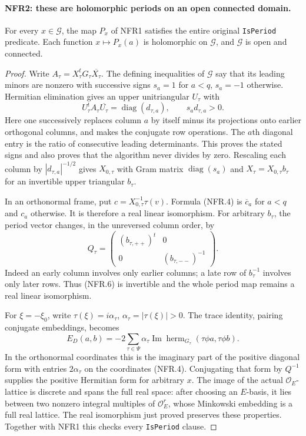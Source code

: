 \paragraph{NFR2: these are holomorphic periods on an open connected domain.}
\label{claim:NFR2}
For every $x\in\mathcal G$, the map $P_x$ of NFR1 satisfies the
entire original \texttt{IsPeriod} predicate.  Each function
$x\mapsto P_x(a)$ is holomorphic on $\mathcal G$, and
$\mathcal G$ is open and connected.

\begin{proof}
Write $A_\tau=X_\tau^tG_\tau\overline{X_\tau}$.
The defining inequalities of $\mathcal G$ say that its leading
minors are nonzero with successive signs
$s_a=1$ for $a<q$, $s_a=-1$ otherwise.
Hermitian elimination gives an upper unitriangular $U_\tau$ with
\[
 U_\tau^tA_\tau\overline{U_\tau}
       =\operatorname{diag}(d_{\tau,a}),\qquad s_a d_{\tau,a}>0.
 \tag{NFR.5}
\]
Here one successively replaces column $a$ by itself minus its
projections onto earlier orthogonal columns, and makes the
conjugate row operations.  The $a$th diagonal entry is the ratio
of consecutive leading determinants.  This proves the stated signs
and also proves that the algorithm never divides by zero.
Rescaling each column by $|d_{\tau,a}|^{-1/2}$ gives $X_{0,\tau}$
with Gram matrix $\operatorname{diag}(s_a)$ and
$X_\tau=X_{0,\tau}b_\tau$ for an invertible upper triangular $b_\tau$.

In an orthonormal frame, put $c=X_{0,\tau}^{-1}\tau(v)$.
Formula (NFR.4) is $\overline c_a$ for $a<q$ and $c_a$ otherwise.
It is therefore a real linear isomorphism.  For arbitrary $b_\tau$,
the period vector changes, in the unreversed column order, by
\[
 Q_\tau=
 \begin{pmatrix} (b_{\tau,++})^t&0\\0&(b_{\tau,--})^{-1}\end{pmatrix}.
 \tag{NFR.6}
\]
Indeed an early column involves only earlier columns; a late row
of $b_\tau^{-1}$ involves only later rows.  Thus (NFR.6) is
invertible and the whole period map remains a real linear isomorphism.

For $\xi=-\xi_0$, write $\tau(\xi)=i\alpha_\tau$,
$\alpha_\tau=|\tau(\xi)|>0$.
The trace identity, pairing conjugate embeddings, becomes
\[
 E_D(a,b)=-2\sum_{\tau\in\Psi}\alpha_\tau
          \operatorname{Im}\operatorname{herm}_{G_\tau}
                         (\tau\phi a,\tau\phi b).
 \tag{NFR.7}
\]
In the orthonormal coordinates this is the imaginary part of the
positive diagonal form with entries $2\alpha_\tau$ on the
coordinates (NFR.4).  Conjugating that form by $Q^{-1}$ supplies
the positive Hermitian form for arbitrary $x$.
The image of the actual $\mathcal O_E$-lattice is discrete and
spans the full real space: after choosing an $E$-basis, it lies
between two nonzero integral multiples of $\mathcal O_E^r$,
whose Minkowski embedding is a full real lattice.  The real
isomorphism just proved preserves these properties.
Together with NFR1 this checks every \texttt{IsPeriod} clause.


\end{proof}

